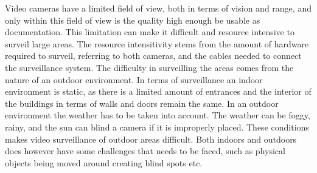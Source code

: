 Video cameras have a limited field of view, both in terms of vision and range, and only within this field of view is the quality high enough be usable as documentation.
This limitation can make it difficult and resource intensive to surveil large areas.
The resource intensitivity stems from the amount of hardware required to surveil, referring to both cameras, and the cables needed to connect the surveillance system.
The difficulty in surveilling the areas comes from the nature of an outdoor environment.
In terms of surveillance an indoor environment is static, as there is a limited amount of entrances and the interior of the buildings in terms of walls and doors remain the same.
In an outdoor environment the weather has to be taken into account.
The weather can be foggy, rainy, and the sun can blind a camera if it is improperly placed.
These conditions makes video surveillance of outdoor areas difficult.
Both indoors and outdoors does however have some challenges that needs to be faced, such as physical objects being moved around creating blind spots etc.

